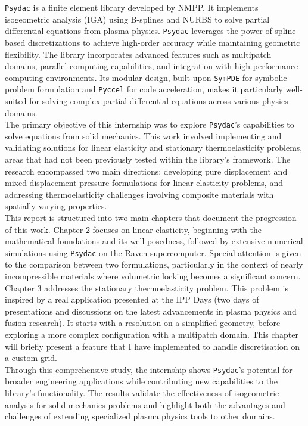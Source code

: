 \documentclass[a4paper,12pt,twoside]{report}
\begin{document}
\texttt{Psydac} is a finite element library developed by NMPP. It implements isogeometric analysis (IGA) using B-splines and NURBS to solve partial differential equations from plasma physics. \texttt{Psydac} leverages the power of spline-based discretizations to achieve high-order accuracy while maintaining geometric flexibility. The library incorporates advanced features such as multipatch domains, parallel computing capabilities, and integration with high-performance computing environments. Its modular design, built upon \texttt{SymPDE} for symbolic problem formulation and \texttt{Pyccel} for code acceleration, makes it particularly well-suited for solving complex partial differential equations across various physics domains.\\

The primary objective of this internship was to explore \texttt{Psydac}'s capabilities to solve equations from solid mechanics. This work involved implementing and validating solutions for linear elasticity and stationary thermoelasticity problems, areas that had not been previously tested within the library's framework. The research encompassed two main directions: developing pure displacement and mixed displacement-pressure formulations for linear elasticity problems, and addressing thermoelasticity challenges involving composite materials with spatially varying properties.\\

This report is structured into two main chapters that document the progression of this work. Chapter 2 focuses on linear elasticity, beginning with the mathematical foundations and its well-posedness, followed by extensive numerical simulations using \texttt{Psydac} on the Raven supercomputer. Special attention is given to the comparison between two formulations, particularly in the context of nearly incompressible materials where volumetric locking becomes a significant concern. Chapter 3 addresses the stationary thermoelasticity problem. This problem is inspired by a real application presented at the IPP Days (two days of presentations and discussions on the latest advancements in plasma physics and fusion research). It starts with a resolution on a simplified geometry, before exploring a more complex configuration with a multipatch domain. This chapter will briefly present a feature that I have implemented to handle discretisation on a custom grid.\\

Through this comprehensive study, the internship shows \texttt{Psydac}'s potential for broader engineering applications while contributing new capabilities to the library's functionality. The results validate the effectiveness of isogeometric analysis for solid mechanics problems and highlight both the advantages and challenges of extending specialized plasma physics tools to other domains.
\end{document}
